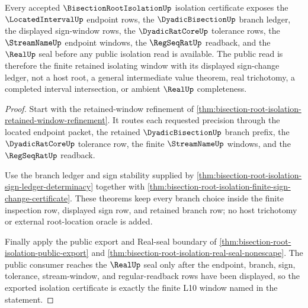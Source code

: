 \begin{theorem}
\label{thm:bisectionrootisolation-public-isolation-certificate}
Every accepted $\BisectionRootIsolationUp$ isolation certificate exposes the $\LocatedIntervalUp$ endpoint rows, the $\DyadicBisectionUp$ branch ledger, the displayed sign-window rows, the $\DyadicRatCoreUp$ tolerance rows, the $\StreamNameUp$ endpoint windows, the $\RegSeqRatUp$ readback, and the $\RealUp$ seal before any public isolation read is available. The public read is therefore the finite retained isolating window with its displayed sign-change ledger, not a host root, a general intermediate value theorem, real trichotomy, a completed interval intersection, or ambient $\RealUp$ completeness.
\end{theorem}
\begin{proof}
Start with the retained-window refinement of \autoref{thm:bisection-root-isolation-retained-window-refinement}. It routes each requested precision through the located endpoint packet, the retained $\DyadicBisectionUp$ branch prefix, the $\DyadicRatCoreUp$ tolerance row, the finite $\StreamNameUp$ windows, and the $\RegSeqRatUp$ readback.

Use the branch ledger and sign stability supplied by \autoref{thm:bisection-root-isolation-sign-ledger-determinacy} together with \autoref{thm:bisection-root-isolation-finite-sign-change-certificate}. These theorems keep every branch choice inside the finite inspection row, displayed sign row, and retained branch row; no host trichotomy or external root-location oracle is added.

Finally apply the public export and Real-seal boundary of \autoref{thm:bisection-root-isolation-public-export} and \autoref{thm:bisection-root-isolation-real-seal-nonescape}. The public consumer reaches the $\RealUp$ seal only after the endpoint, branch, sign, tolerance, stream-window, and regular-readback rows have been displayed, so the exported isolation certificate is exactly the finite L10 window named in the statement.
\end{proof}

